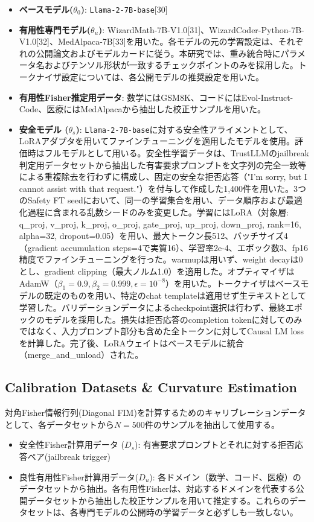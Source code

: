 \documentclass{article}
\begin{document}
\begin{itemize}
\item \textbf{ベースモデル($\theta_0$)}: \texttt{Llama-2-7B-base}[30]
\item \textbf{有用性専門モデル($\theta_u$)}: WizardMath-7B-V1.0[31]、WizardCoder-Python-7B-V1.0[32]、MedAlpaca-7B[33]を用いた。各モデルの元の学習設定は、それぞれの公開論文およびモデルカードに従う。本研究では、重み統合時にパラメータ名およびテンソル形状が一致するチェックポイントのみを採用した。トークナイザ設定については、各公開モデルの推奨設定を用いた。
\item \textbf{有用性Fisher推定用データ}: 数学にはGSM8K、コードにはEvol-Instruct-Code、医療にはMedAlpacaから抽出した校正サンプルを用いた。
\item \textbf{安全モデル ($\theta_s$)}: \texttt{Llama-2-7B-base}に対する安全性アライメントとして、LoRAアダプタを用いてファインチューニングを適用したモデルを使用。評価時はフルモデルとして用いる。安全性学習データは、TrustLLMのjailbreak判定用データセットから抽出した有害要求プロンプトを文字列の完全一致等による重複除去を行わずに構成し、固定の安全な拒否応答（"I'm sorry, but I cannot assist with that request."）を付与して作成した1,400件を用いた。3つのSafety FT seedにおいて、同一の学習集合を用い、データ順序および最適化過程に含まれる乱数シードのみを変更した。学習にはLoRA（対象層: q\_proj, v\_proj, k\_proj, o\_proj, gate\_proj, up\_proj, down\_proj, rank=16, alpha=32, dropout=0.05）を用い、最大トークン長512、バッチサイズ4（gradient accumulation steps=4で実質16）、学習率2e-4、エポック数3、fp16精度でファインチューニングを行った。warmupは用いず、weight decayは0とし、gradient clipping（最大ノルム1.0）を適用した。オプティマイザはAdamW（\(\beta_1=0.9, \beta_2=0.999, \epsilon=10^{-8}\)）を用いた。トークナイザはベースモデルの既定のものを用い、特定のchat templateは適用せず生テキストとして学習した。バリデーションデータによるcheckpoint選択は行わず、最終エポックのモデルを採用した。損失は拒否応答のcompletion tokenに対してのみではなく、入力プロンプト部分も含めた全トークンに対してCausal LM lossを計算した。完了後、LoRAウェイトはベースモデルに統合（merge\_and\_unload）された。
\end{itemize}

\subsection{Calibration Datasets \& Curvature Estimation}
\label{app:calibration_datasets}
対角Fisher情報行列(Diagonal FIM)を計算するためのキャリブレーションデータとして、各データセットから$N=500$件のサンプルを抽出して使用する。
\begin{itemize}
\item 安全性Fisher計算用データ ($D_s$): 有害要求プロンプトとそれに対する拒否応答ペア(jailbreak trigger)
\item 良性有用性Fisher計算用データ($D_u$): 各ドメイン（数学、コード、医療）のデータセットから抽出。各有用性Fisherは、対応するドメインを代表する公開データセットから抽出した校正サンプルを用いて推定する。これらのデータセットは、各専門モデルの公開時の学習データと必ずしも一致しない。
\end{itemize}
\end{document}
